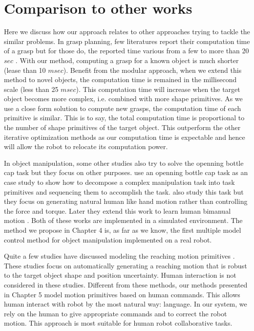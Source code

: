 \section{Comparison to other works}
\label{cha6:comparison}
Here we discuss how our approach relates to other approaches trying to tackle the similar problems. In grasp planning, few literatures report their computation time of a grasp but for those do, the reported time various from a few to more than 20 $sec$ \citep{harada2008fast,daoud2011fast,S.ElKhoury2012}. With our method, computing a grasp for a known object is much shorter (lease than 10 $msec$). Benefit from the modular approach, when we extend this method to novel objects, the computation time is remained in the millisecond scale (less than 25 $msec$). This computation time will increase when the target object becomes more complex, i.e. combined with more shape primitives. As we use a close form solution to compute new grasps, the computation time of each primitive is similar. This is to say, the total computation time is proportional to the number of shape primitives of the target object. This outperform the other iterative optimization methods as our computation time is expectable and hence will allow the robot to relocate its computation power.

In object manipulation, some other studies also try to solve the openning bottle cap task but they focus on other purposes. \citet{michelman1994forming} use an openning bottle cap task as an case study to show how to decompose a complex manipulation task into task primitives and sequencing them to accomplish the task. \citet{steffen2008towards} also study this task but they focus on generating natural human like hand motion rather than controlling the force and torque. Later they extend this work to learn human bimanual motion \citep{steffen2010bio}. Both of these works are implemented in a simulated environment. The method we propose in Chapter 4 is, as far as we know, the first multiple model control method for object manipulation implemented on a real robot.

Quite a few studies have discussed modeling the reaching motion primitives \citep{kroemer2011grasping,stulp2011learning,stulp2012reinforcement}. These studies focus on automatically generating a reaching motion that is robust to the target object shape and position uncertainty. Human interaction is not considered in these studies. Different from these methods, our methods presented in Chapter 5 model motion primitives based on human commands. This allows human interact with robot by the most natural way: language. In our system, we rely on the human to give appropriate commands and to correct the robot motion. This approach is most suitable for human robot collaborative tasks.

